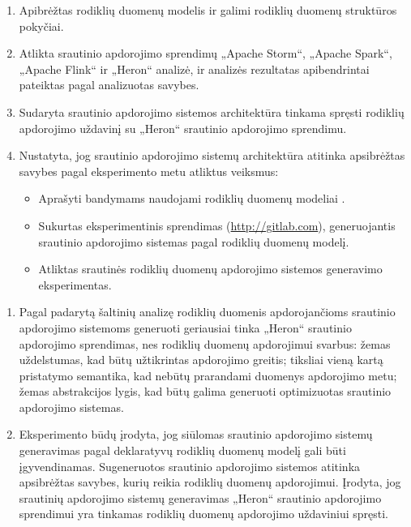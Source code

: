 \documentclass{VUMIFPSbakalaurinis}
\begin{document}
\begin{enumerate}
    \item Apibrėžtas rodiklių duomenų modelis ir galimi rodiklių duomenų struktūros pokyčiai.
    \item Atlikta srautinio apdorojimo sprendimų „Apache Storm“, „Apache Spark“, „Apache Flink“ ir „Heron“ analizė, ir analizės rezultatas apibendrintai pateiktas pagal analizuotas savybes. 
    \item Sudaryta srautinio apdorojimo sistemos architektūra tinkama spręsti rodiklių apdorojimo uždavinį su „Heron“ srautinio apdorojimo sprendimu. 
    \item Nustatyta, jog srautinio apdorojimo sistemų architektūra atitinka apsibrėžtas savybes pagal eksperimento metu atliktus veiksmus:
    \begin{itemize}
        \item Aprašyti bandymams naudojami rodiklių duomenų modeliai .
        \item Sukurtas eksperimentinis sprendimas (\url{http://gitlab.com}), generuojantis srautinio apdorojimo sistemas pagal rodiklių duomenų modelį.
        \item Atliktas srautinės rodiklių duomenų apdorojimo sistemos generavimo eksperimentas. 
    \end{itemize} 
\end{enumerate}

\begin{enumerate}
    \item Pagal padarytą šaltinių analizę rodiklių duomenis apdorojančioms srautinio apdorojimo sistemoms generuoti geriausiai tinka „Heron“ srautinio apdorojimo sprendimas, nes rodiklių duomenų apdorojimui svarbus: žemas uždelstumas, kad būtų užtikrintas apdorojimo greitis; tiksliai vieną kartą pristatymo semantika, kad nebūtų prarandami duomenys apdorojimo metu; žemas abstrakcijos lygis, kad būtų galima generuoti optimizuotas srautinio apdorojimo sistemas.
    \item Eksperimento būdų įrodyta, jog siūlomas srautinio apdorojimo sistemų generavimas pagal deklaratyvų rodiklių duomenų modelį gali būti įgyvendinamas. Sugeneruotos srautinio apdorojimo sistemos atitinka apsibrėžtas savybes, kurių reikia rodiklių duomenų apdorojimui. Įrodyta, jog srautinių apdorojimo sistemų generavimas „Heron“ srautinio apdorojimo sprendimui yra tinkamas rodiklių duomenų apdorojimo uždaviniui spręsti.  
\end{enumerate}
\end{document}
